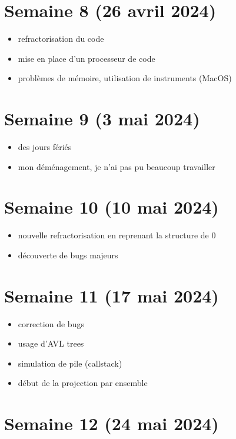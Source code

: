 \documentclass[a4paper,12pt]{article}
\begin{document}
\section{Semaine 8 (26 avril 2024)}

\begin{itemize}
  \item refractorisation du code
  \item mise en place d'un processeur de code
  \item problèmes de mémoire, utilisation de instruments (MacOS)
\end{itemize}

\section{Semaine 9 (3 mai 2024)}

\begin{itemize}
  \item des jours fériés
  \item mon déménagement, je n'ai pas pu beaucoup travailler
\end{itemize}

\section{Semaine 10 (10 mai 2024)}

\begin{itemize}
  \item nouvelle refractorisation en reprenant la structure de 0
  \item découverte de bugs majeurs
\end{itemize}

\section{Semaine 11 (17 mai 2024)}

\begin{itemize}
  \item correction de bugs
  \item usage d'AVL trees
  \item simulation de pile (callstack)
  \item début de la projection par ensemble
\end{itemize}

\section{Semaine 12 (24 mai 2024)}
\end{document}

